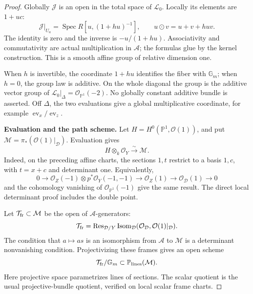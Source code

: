 \documentclass[11pt,a4paper]{article}
\newcommand{\mathscr}{\mathcal}
\theoremstyle{named}\newtheorem{finding}{Finding}[section]
\theoremstyle{definition}\newtheorem{definition}[finding]{Definition}
\theoremstyle{remark}\newtheorem{remark}[finding]{Remark}
\begin{document}
\begin{proof}
Globally \(\mathcal J\) is an open in the total space
of \(\mathcal L_0\). Locally its elements are \(1+uc\):
\begin{equation}\label{eq:variableQuotientGroupLaw}
 \mathcal J|_{U_a}
   =\operatorname{Spec}R[u,(1+hu)^{-1}],
 \qquad u\odot v=u+v+huv.
\end{equation}
The identity is zero and the inverse is
\(-u/(1+hu)\). Associativity and commutativity
are actual multiplication in \(\mathcal A\);
the formulas glue by the kernel construction.
This is a smooth affine group of relative dimension one.

When \(h\) is invertible, the coordinate \(1+hu\)
identifies the fiber with \(\mathbb G_m\);
when \(h=0\), the group law is additive.
On the whole diagonal the group is the additive
vector group of
\(\mathcal L_0|_\Delta=\mathcal O_{\mathbb P^1}(-2)\).
No globally constant additive bundle is asserted.
Off \(\Delta\), the two evaluations give a global
multiplicative coordinate, for example
\(\operatorname{ev}_x/\operatorname{ev}_z\).

\par\smallskip\noindent\textbf{Evaluation and the path scheme.}\quad
Let \(H=H^0(\mathbb P^1,\mathcal O(1))\), and put
\(\mathcal M=\pi_*(\mathcal O(1)|_{\mathscr D})\).
Evaluation gives
\begin{equation}\label{eq:variableQuotientEvaluation}
                 H\otimes_k\mathcal O_Y
                       \xrightarrow{\sim}\mathcal M.
\end{equation}
Indeed, on the preceding affine charts, the sections
\(1,t\) restrict to a basis \(1,c\), with \(t=x+c\)
and determinant one.
Equivalently,
\[
 0\to\mathcal O_Z(-1)\otimes p^*\mathcal O_Y(-1,-1)
   \to\mathcal O_Z(1)\to\mathcal O_{\mathscr D}(1)\to0
\]
and the cohomology vanishing of \(\mathcal O_{\mathbb P^1}(-1)\)
give the same result.
The direct local determinant proof includes the double point.

Let \(\mathcal T_{\rm fr}\subset\mathcal M\) be the
open of \(\mathcal A\)-generators:
\[
 \mathcal T_{\rm fr}
  =\operatorname{Res}_{\mathscr D/Y}
       \operatorname{Isom}_{\mathscr D}
       (\mathcal O_{\mathscr D},\mathcal O(1)|_{\mathscr D}).
\]
The condition that \(a\mapsto as\) is an isomorphism
from \(\mathcal A\) to \(\mathcal M\) is a determinant
nonvanishing condition.
Projectivizing these frames gives an open scheme
\[
 \mathcal T_{\rm fr}/\mathbb G_m
       \subset\mathbb P_{\rm lines}(\mathcal M).
\]
Here projective space parametrizes lines of sections.
The scalar quotient is the usual projective-bundle
quotient, verified on local scalar frame charts.


\end{proof}
\end{document}
